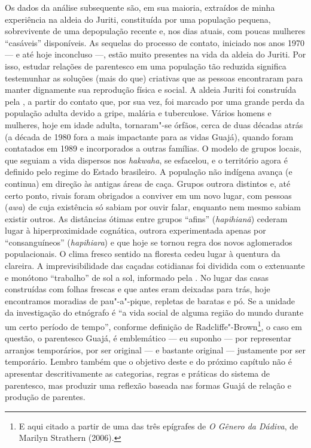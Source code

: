 Os dados da análise subsequente são, em sua maioria, extraídos de minha
experiência na aldeia do  Juriti, constituída por uma população
pequena, sobrevivente de uma depopulação recente e, nos dias atuais, com
poucas mulheres ``casáveis'' disponíveis. As sequelas do processo de
contato, iniciado nos anos 1970 --- e até hoje inconcluso ---, estão muito
presentes na vida da aldeia do  Juriti. Por isso, estudar relações de
parentesco em uma população tão reduzida significa testemunhar as
soluções (mais do que) criativas que as pessoas encontraram para manter
dignamente sua reprodução física e social. A aldeia Juriti foi
construída pela , a partir do contato que, por sua vez, foi marcado
por uma grande perda da população adulta devido a gripe, malária e
tuberculose. Vários homens e mulheres, hoje em idade adulta, tornaram"-se
órfãos, cerca de duas décadas atrás (a década de 1980 fora a mais
impactante para as vidas Guajá), quando foram contatados em 1989 e
incorporados a outras famílias. O modelo de grupos locais, que seguiam a
vida dispersos nos \emph{hakwaha}, se esfacelou, e o território agora é
definido pelo regime do Estado brasileiro. A população não indígena
avança (e continua) em direção às antigas áreas de caça. Grupos outrora
distintos e, até certo ponto, rivais foram obrigados a conviver em um
novo lugar, com pessoas (\emph{awa}) de cuja existência só sabiam por
ouvir falar, enquanto nem mesmo sabiam existir outros. As distâncias
ótimas entre grupos ``afins'' (\emph{hapihianã}) cederam lugar à
hiperproximidade cognática, outrora experimentada apenas por
``consanguíneos'' (\emph{hapihiara}) e que hoje se tornou regra dos novos
aglomerados populacionais. O clima fresco sentido na floresta cedeu
lugar à quentura da clareira. A imprevisibilidade das caçadas cotidianas
foi dividida com o extenuante e monótono ``trabalho'' de sol a sol,
informado pela . No lugar das casas construídas com folhas frescas
e que antes eram deixadas para trás, hoje encontramos moradias de
pau"-a"-pique, repletas de baratas e pó. Se a unidade da investigação do
etnógrafo é ``a vida social de alguma região do mundo durante um certo
período de tempo'', conforme definição de Radcliffe"-Brown\footnote{E aqui
  citado a partir de uma das três epígrafes de \emph{O Gênero da
  Dádiva}, de Marilyn Strathern (2006).}, o caso em questão, o
parentesco Guajá, é emblemático --- eu suponho --- por representar arranjos
temporários, por ser original --- e bastante original --- justamente por ser
temporário. Lembro também que o objetivo deste e do próximo capítulo não
é apresentar descritivamente as categorias, regras e práticas do sistema
de parentesco, mas produzir uma reflexão baseada nas formas Guajá de
relação e produção de parentes.


